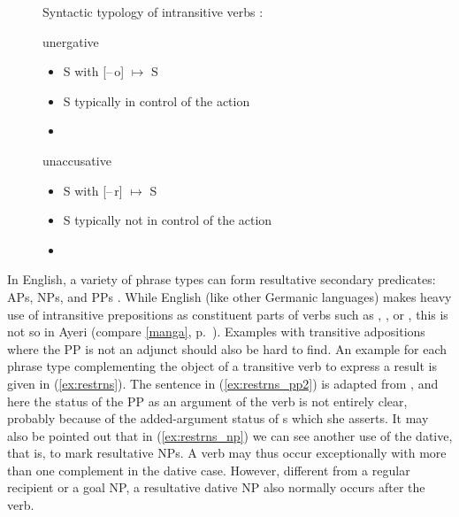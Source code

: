 \begin{figure}
\pex\label{ex:verbtyp}%
Syntactic typology of intransitive verbs
\parencites{perlmutter1978}{bresnan2016}:
\a \begin{minipage}[t]{\remaining}
	unergative
	\begin{itemize}[leftmargin=*]
		\item S with [–\,o] $\mapsto$ S
		\item S typically in control of the action
		\item {}
	\end{itemize}
	\end{minipage}

\a \begin{minipage}[t]{\remaining}
	unaccusative
	\begin{itemize}[leftmargin=*]
		\item S with [–\,r] $\mapsto$ S
		\item S typically not in control of the action
		\item {}
	\end{itemize}
	\end{minipage}
\xe
\end{figure}

In English, a variety of phrase types can form resultative secondary
predicates: APs, NPs, and PPs \parencites{simpson1983}{christie2013}. While
English (like other Germanic languages) makes heavy use of intransitive
prepositions as constituent parts of verbs such as , , or , this is not so in Ayeri (compare \autoref{manga},
p.~\pageref{manga}). Examples with transitive adpositions where the PP is not
an adjunct should also be hard to find. An example for each phrase type
complementing the object of a transitive verb to express a result is given in
(\ref{ex:restrns}). The sentence in (\ref{ex:restrns_pp2}) is adapted from
\citet{christie2013}, and here the status of the PP as an argument of the verb
is not entirely clear, probably because of the added-argument status of
\XCompl{}s which she asserts. It may also be pointed out that in 
(\ref{ex:restrns_np}) we can see another use of the dative, that is, to mark
resultative NPs. A verb may thus occur exceptionally with more than one
complement in the dative case. However, different from a regular recipient or
a goal NP, a resultative dative NP also normally occurs after the verb.


